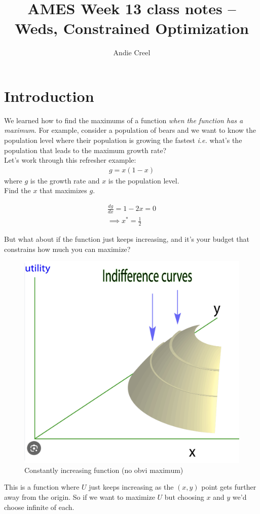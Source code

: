 \documentclass{article}
\title{AMES Week 13 class notes -- Weds, Constrained Optimization}
\author{Andie Creel}
\begin{document}
\maketitle
\section{Introduction}
We learned how to find the maximums of a function \textit{when the function has a maximum}. For example, consider a population of bears and we want to know the population level where their population is growing the fastest \textit{i.e.} what's the population that leads to the maximum growth rate?\\

Let's work through this refresher example:
\begin{align}
    g = x(1 - x)
\end{align}
where $g$ is the growth rate and $x$ is the population level. \\

Find the $x$ that maximizes $g$. 

\begin{align}
    \frac{d g}{d x} = 1 - 2x = 0\\
   \implies x^* = \frac{1}{2}
\end{align}

But what about if the function just keeps increasing, and it's your budget that constrains how much you can maximize? 

\begin{figure}[htp]
    \centering
    \includegraphics[width=0.5\linewidth]{Screen Shot 2023-12-01 at 1.17.20 PM.png}
    \caption{Constantly increasing function (no obvi maximum)}
    \label{fig:enter-label}
\end{figure}
This is a function where $U$ just keeps increasing as the $(x,y)$ point gets further away from the origin. So if we want to maximize $U$ but choosing $x$ and $y$ we'd choose infinite of each. \\
\end{document}
